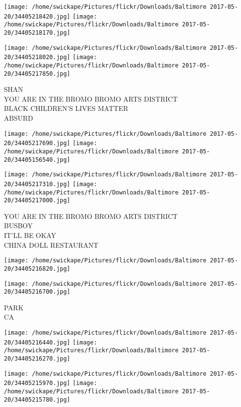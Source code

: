 \documentclass[10pt,letterpaper]{article}
\begin{document}
\texttt{[image: /home/swickape/Pictures/flickr/Downloads/Baltimore 2017-05-20/34405218420.jpg]}
\texttt{[image: /home/swickape/Pictures/flickr/Downloads/Baltimore 2017-05-20/34405218170.jpg]}

\texttt{[image: /home/swickape/Pictures/flickr/Downloads/Baltimore 2017-05-20/34405218020.jpg]}
\texttt{[image: /home/swickape/Pictures/flickr/Downloads/Baltimore 2017-05-20/34405217850.jpg]}

SHAN\\
YOU ARE IN THE BROMO BROMO ARTS DISTRICT\\
BLACK CHILDREN'S LIVES MATTER\\
ABSURD\\
\pagebreak

\texttt{[image: /home/swickape/Pictures/flickr/Downloads/Baltimore 2017-05-20/34405217690.jpg]}
\texttt{[image: /home/swickape/Pictures/flickr/Downloads/Baltimore 2017-05-20/34405156540.jpg]}

\texttt{[image: /home/swickape/Pictures/flickr/Downloads/Baltimore 2017-05-20/34405217310.jpg]}
\texttt{[image: /home/swickape/Pictures/flickr/Downloads/Baltimore 2017-05-20/34405217000.jpg]}

YOU ARE IN THE BROMO BROMO ARTS DISTRICT\\
BUSBOY\\
IT'LL BE OKAY\\
CHINA DOLL RESTAURANT\\
\pagebreak

\texttt{[image: /home/swickape/Pictures/flickr/Downloads/Baltimore 2017-05-20/34405216820.jpg]}

\vspace{0.25in}
\texttt{[image: /home/swickape/Pictures/flickr/Downloads/Baltimore 2017-05-20/34405216700.jpg]}

PARK\\
CA\\
\pagebreak

\texttt{[image: /home/swickape/Pictures/flickr/Downloads/Baltimore 2017-05-20/34405216440.jpg]}
\texttt{[image: /home/swickape/Pictures/flickr/Downloads/Baltimore 2017-05-20/34405216270.jpg]}

\texttt{[image: /home/swickape/Pictures/flickr/Downloads/Baltimore 2017-05-20/34405215970.jpg]}
\texttt{[image: /home/swickape/Pictures/flickr/Downloads/Baltimore 2017-05-20/34405215780.jpg]}
\end{document}
